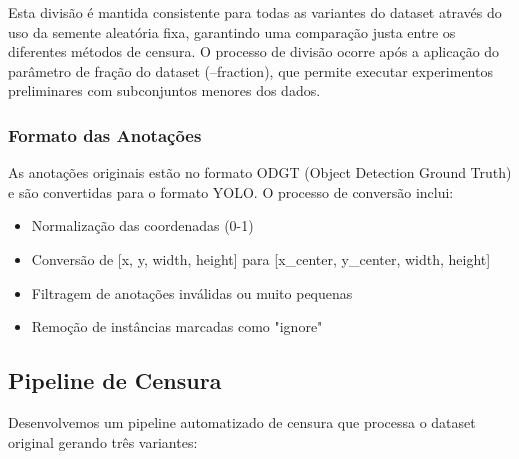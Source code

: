 \documentclass[12pt,a4paper]{article}
\begin{document}
Esta divisão é mantida consistente para todas as variantes do dataset através do uso da semente aleatória fixa, garantindo uma comparação justa entre os diferentes métodos de censura. O processo de divisão ocorre após a aplicação do parâmetro de fração do dataset (--fraction), que permite executar experimentos preliminares com subconjuntos menores dos dados.

\subsubsection{Formato das Anotações}
As anotações originais estão no formato ODGT (Object Detection Ground Truth) e são convertidas para o formato YOLO. O processo de conversão inclui:

\begin{itemize}
    \item Normalização das coordenadas (0-1)
    \item Conversão de [x, y, width, height] para [x\_center, y\_center, width, height]
    \item Filtragem de anotações inválidas ou muito pequenas
    \item Remoção de instâncias marcadas como "ignore"
\end{itemize}

\subsection{Pipeline de Censura}
Desenvolvemos um pipeline automatizado de censura que processa o dataset original gerando três variantes:
\end{document}

